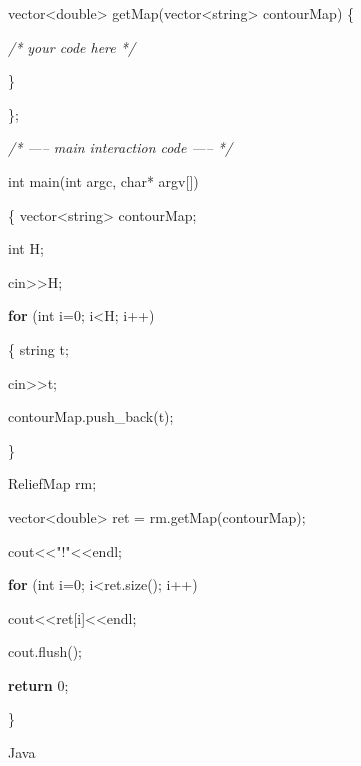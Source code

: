 \documentclass[]{article}
\newenvironment{Shaded}{}{}
\newcommand{\CommentTok}[1]{\textcolor[rgb]{0.38,0.63,0.69}{\textit{#1}}}
\newcommand{\ControlFlowTok}[1]{\textcolor[rgb]{0.00,0.44,0.13}{\textbf{#1}}}
\newcommand{\DataTypeTok}[1]{\textcolor[rgb]{0.56,0.13,0.00}{#1}}
\newcommand{\DecValTok}[1]{\textcolor[rgb]{0.25,0.63,0.44}{#1}}
\newcommand{\NormalTok}[1]{#1}
\newcommand{\StringTok}[1]{\textcolor[rgb]{0.25,0.44,0.63}{#1}}
\begin{document}
\begin{Shaded}
\begin{Highlighting}[]
\NormalTok{   vector<}\DataTypeTok{double}\NormalTok{> getMap(vector<string> contourMap) \{}

       \CommentTok{/* your code here */}

\NormalTok{   \}}

\NormalTok{\};}

\CommentTok{/* ----- main interaction code ----- */}

\DataTypeTok{int}\NormalTok{ main(}\DataTypeTok{int}\NormalTok{ argc, }\DataTypeTok{char}\NormalTok{* argv[])}

\NormalTok{\{   vector<string> contourMap;}

   \DataTypeTok{int}\NormalTok{ H;}

\NormalTok{   cin>>H;}

   \ControlFlowTok{for}\NormalTok{ (}\DataTypeTok{int}\NormalTok{ i=}\DecValTok{0}\NormalTok{; i<H; i++)}

\NormalTok{   \{   string t;}

\NormalTok{       cin>>t;}

\NormalTok{       contourMap.push_back(t);}

\NormalTok{   \}}

\NormalTok{   ReliefMap rm;}

\NormalTok{   vector<}\DataTypeTok{double}\NormalTok{> ret = rm.getMap(contourMap);}

\NormalTok{   cout<<}\StringTok{"!"}\NormalTok{<<endl;}

   \ControlFlowTok{for}\NormalTok{ (}\DataTypeTok{int}\NormalTok{ i=}\DecValTok{0}\NormalTok{; i<ret.size(); i++)}

\NormalTok{       cout<<ret[i]<<endl;}

\NormalTok{   cout.flush();}

   \ControlFlowTok{return} \DecValTok{0}\NormalTok{;}

\NormalTok{\}}
\end{Highlighting}
\end{Shaded}

Java
\end{document}
